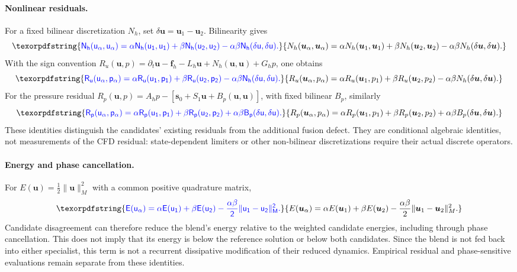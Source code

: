 \documentclass{article}
\providecommand{\DIFaddtex}[1]{{\protect\color{blue} \sf #1}} %
\providecommand{\DIFaddend}{} %
\providecommand{\DIFadd}[1]{\texorpdfstring{\DIFaddtex{#1}}{#1}} %
\DeclareRobustCommand{\DIFaddend}{\DIFOaddend \let\includegraphics\DIFOincludegraphics} %
\begin{document}
\paragraph{\DIFadd{Nonlinear residuals.}}
\DIFadd{For a fixed bilinear discretization $N_h$, set $\delta\bm u=\bm u_1-\bm u_2$. Bilinearity gives
}\begin{equation}
\DIFadd{N_h(\bm u_\alpha,\bm u_\alpha)
=\alpha N_h(\bm u_1,\bm u_1)+\beta N_h(\bm u_2,\bm u_2)
-\alpha\beta N_h(\delta\bm u,\delta\bm u).
}\end{equation}
\DIFadd{With the sign convention
$R_u(\bm u,p)=\partial_t\bm u-\bm f_h-L_h\bm u+N_h(\bm u,\bm u)+G_hp$, one obtains
}\begin{equation}
\DIFadd{R_u(\bm u_\alpha,p_\alpha)
=\alpha R_u(\bm u_1,p_1)+\beta R_u(\bm u_2,p_2)
-\alpha\beta N_h(\delta\bm u,\delta\bm u).
}\end{equation}
\DIFadd{For the pressure residual
$R_p(\bm u,p)=A_hp-[\bm s_0+S_1\bm u+B_p(\bm u,\bm u)]$, with fixed bilinear $B_p$, similarly
}\begin{equation}
\DIFadd{R_p(\bm u_\alpha,p_\alpha)
=\alpha R_p(\bm u_1,p_1)+\beta R_p(\bm u_2,p_2)
+\alpha\beta B_p(\delta\bm u,\delta\bm u).
}\end{equation}
\DIFadd{These identities distinguish the candidates' existing residuals from the additional fusion defect. They are conditional algebraic identities, not measurements of the CFD residual: state-dependent limiters or other non-bilinear discretizations require their actual discrete operators.
}

\paragraph{\DIFadd{Energy and phase cancellation.}}
\DIFadd{For $E(\bm u)=\tfrac12\|\bm u\|_M^2$ with a common positive quadrature matrix,
}\begin{equation}
\DIFadd{E(\bm u_\alpha)=\alpha E(\bm u_1)+\beta E(\bm u_2)
-\frac{\alpha\beta}{2}\|\bm u_1-\bm u_2\|_M^2.
}\end{equation}
\DIFadd{Candidate disagreement can therefore reduce the blend's energy relative to the weighted candidate energies, including through phase cancellation. This does not imply that its energy is below the reference solution or below both candidates. Since the blend is not fed back into either specialist, this term is not a recurrent dissipative modification of their reduced dynamics. Empirical residual and phase-sensitive evaluations remain separate from these identities}\DIFaddend .
\end{document}
